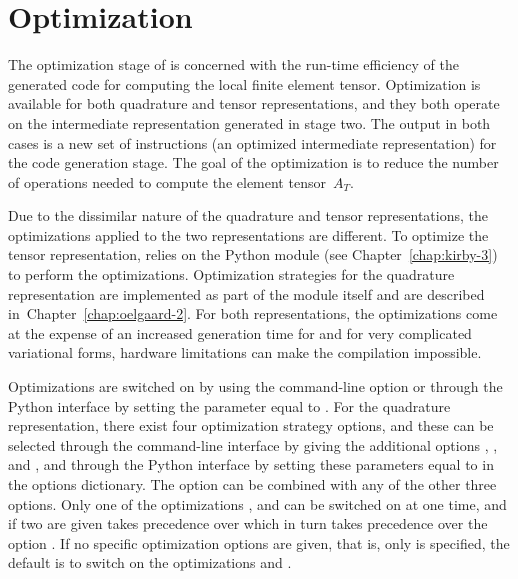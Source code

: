 \section{Optimization}

The optimization stage of \ffc{} is concerned with the run-time
efficiency of the generated code for computing the local finite
element tensor. Optimization is available for both quadrature and
tensor representations, and they both operate on the intermediate
representation generated in stage two. The output in both cases is a
new set of instructions (an optimized intermediate representation) for
the code generation stage. The goal of the optimization is to reduce
the number of operations needed to compute the element tensor~$A_T$.

Due to the dissimilar nature of the quadrature and tensor representations,
the optimizations applied to the two representations are different.
To optimize the tensor representation, \ffc{} relies on the Python
module \ferari{} (see Chapter~\ref{chap:kirby-3}) to perform the
optimizations. Optimization strategies for the quadrature representation
are implemented as part of the \ffc{} module itself and are described
in~Chapter~\ref{chap:oelgaard-2}.  For both representations, the
optimizations come at the expense of an increased generation time for
\ffc{} and for very complicated variational forms, hardware limitations
can make the compilation impossible.

Optimizations are switched on by using the command-line
option  or through the Python interface by setting the
parameter  equal to . For the quadrature
representation, there exist four optimization strategy options,
and these can be selected through the command-line interface by giving
the additional options , ,
 and ,
and through the Python interface by setting these
parameters equal to  in the options dictionary.
The option  can be combined with
any of the other three options.
Only one of the optimizations ,
 and  can be
switched on at one time, and if two are given 
takes precedence over  which in turn takes
precedence over the option .
If no specific optimization options are given, that is,
only  is specified, the default is to switch on the
optimizations  and
.

